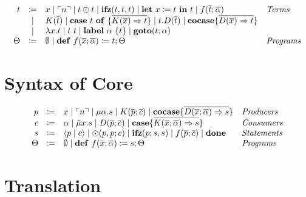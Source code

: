 \documentclass[nonacm]{acmart}
\newcommand{\lit}[1]{\ensuremath{\ulcorner #1\urcorner}}
\newcommand{\cut}[2]{\ensuremath{\langle #1 \mid #2 \rangle}}
\newcommand{\letin}[3]{\ensuremath{\mathbf{let}\ #1 \coloneqq #2\ \mathbf{in}\ #3}}
\newcommand{\caseof}[2]{\ensuremath{\mathbf{case}\ #1\ \mathbf{of}\ \{ #2 \}}}
\begin{document}
\begin{definition}
  \[ 
    \begin{array}{r c l l}
      t & \coloneqq & x \mid \lit{n} \mid t \odot t \mid \mathbf{ifz}(t,t,t) \mid \letin{x}{t}{t} \mid f(\overline{t};\overline{\alpha}) & \emph{Terms}\\

      & \mid & K(\overline{t}) \mid \caseof{t}{\overline{K(\overline{x}) \Rightarrow t}} \mid t.D(\overline{t}) \mid \mathbf{cocase} \{ \overline{D(\overline{x}) \Rightarrow t} \} &\\
      & \mid & \lambda x.t \mid t\ t \mid \mathbf{label}\ \alpha\ \{t\} \mid \mathbf{goto}(t;\alpha) & \\
      \Theta & \coloneqq & \emptyset \mid \mathbf{def}\ f(\overline{x};\overline{\alpha}) \coloneq t; \Theta & \emph{Programs}\\
    \end{array}
  \]
\end{definition}

\section{Syntax of Core}
\label{sec:syntax-of-core}

\begin{definition}
  \[
    \begin{array}{rcll}
      p & \coloneqq & x \mid \lit{n} \mid \mu \alpha.s \mid K(\overline{p};\overline{c}) \mid \mathbf{cocase} \{ \overline{D(\overline{x};\overline{\alpha}) \Rightarrow s}\} & \emph{Producers}\\
      c & \coloneqq & \alpha \mid \tilde{\mu} x.s \mid D(\overline{p};\overline{c}) \mid \mathbf{case} \{ \overline{K(\overline{x};\overline{\alpha}) \Rightarrow s} \}& \emph{Consumers}\\
      s & \coloneqq & \cut{p}{c} \mid \odot(p,p;c) \mid \mathbf{ifz}(p;s,s) \mid f(\overline{p};\overline{c}) \mid \mathbf{done} & \emph{Statements}\\
      \Theta & \coloneqq & \emptyset \mid \mathbf{def}\ f(\overline{x};\overline{\alpha}) \coloneq s; \Theta & \emph{Programs}\\
    \end{array}
  \]
\end{definition}

\section{Translation}
\label{sec:translation}
\end{document}
